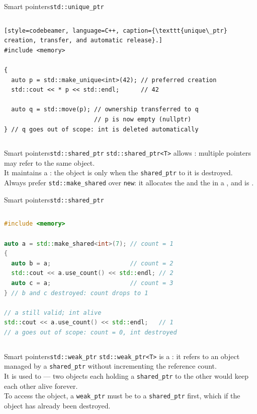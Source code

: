\begin{frame}[fragile]{Smart pointers}{\texttt{std::unique\_ptr}}
  \begin{columns}
		\begin{lstlisting}[style=codebeamer, language=C++, caption={\texttt{unique\_ptr} creation, transfer, and automatic release}.]
#include <memory>

{
  auto p = std::make_unique<int>(42); // preferred creation
  std::cout << * p << std::endl;      // 42

  auto q = std::move(p); // ownership transferred to q
                         // p is now empty (nullptr)
} // q goes out of scope: int is deleted automatically
    \end{lstlisting}
	\end{columns}
\end{frame}
\begin{frame}[fragile]{Smart pointers}{\texttt{std::shared\_ptr}}
	\justifying
	\texttt{std::shared\_ptr<T>} allows : multiple pointers may refer to the same object.\\
  \bigskip
	It maintains a : the object is  only when the  \texttt{shared\_ptr} to it is destroyed.\\
  \bigskip
	Always prefer \texttt{std::make\_shared} over \texttt{new}: it allocates the  and the  in a , and is .
\end{frame}
\begin{frame}[fragile]{Smart pointers}{\texttt{std::shared\_ptr}}
  \begin{columns}
		\begin{lstlisting}[style=codebeamer, language=C++, caption=Reference counting with \texttt{shared\_ptr}.]
#include <memory>

auto a = std::make_shared<int>(7); // count = 1
{
  auto b = a;                      // count = 2
  std::cout << a.use_count() << std::endl; // 2
  auto c = a;                      // count = 3
} // b and c destroyed: count drops to 1

// a still valid; int alive
std::cout << a.use_count() << std::endl;   // 1
// a goes out of scope: count = 0, int destroyed
    \end{lstlisting}
	\end{columns}
\end{frame}
\begin{frame}{Smart pointers}{\texttt{std::weak\_ptr}}
	\justifying
	\texttt{std::weak\_ptr<T>} is a : it refers to an object managed by a \texttt{shared\_ptr} without incrementing the reference count.\\
	\bigskip
	It is used to  — two objects each holding a \texttt{shared\_ptr} to the other would keep each other alive forever.\\
	\bigskip
	To access the object, a \texttt{weak\_ptr} must be  to a \texttt{shared\_ptr} first, which  if the object has already been destroyed.
\end{frame}
